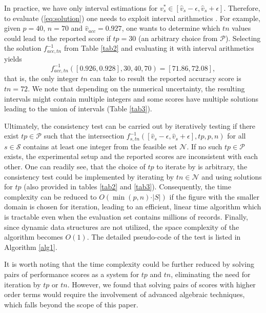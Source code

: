 \documentclass[3p, times]{elsarticle}
\begin{document}
In practice, we have only interval estimations for $v_s^* \in [\hat{v}_s - \epsilon, \hat{v}_s + \epsilon]$. Therefore, to evaluate (\ref{eq:solution}) one needs to exploit interval arithmetics \cite{interval}. For example, given $p=40$, $n=70$ and $\hat{v}_{acc} = 0.927$, one wants to determine which $tn$ values could lead to the reported score if $tp=30$ (an arbitrary choice from $\mathcal{P}$). Selecting the solution $f^{-1}_{acc, tn}$ from Table \ref{tab2} and evaluating it with interval arithmetics yields
\begin{equation}
f^{-1}_{acc, tn}([0.926, 0.928], 30, 40, 70) = [71.86, 72.08],
\end{equation}
that is, the only integer $tn$ can take to result the reported accuracy score is $tn=72$. We note that depending on the numerical uncertainty, the resulting intervals might contain multiple integers and some scores have multiple solutions leading to the union of intervals (Table \ref{tab3}).

Ultimately, the consistency test can be carried out by iteratively testing if there exist $tp\in\mathcal{P}$  such that the intersection $f_{s, tn}^{-1}([\hat{v}_s - \epsilon, \hat{v}_s + \epsilon], tp, p, n)$ for all $s\in\mathcal{S}$ contains at least one integer from the feasible set $\mathcal{N}$. If no such $tp\in\mathcal{P}$ exists, the experimental setup and the reported scores are inconsistent with each other. 
One can readily see, that the choice of $tp$ to iterate by is arbitrary, the consistency test could be implemented by iterating by $tn\in\mathcal{N}$ and using solutions for $tp$ (also provided in tables \ref{tab2} and \ref{tab3}). Consequently, the time complexity can be reduced to $O(\min(p, n)\cdot \vert S\vert)$ if the figure with the smaller domain is chosen for iteration, leading to an efficient, linear time algorithm which is tractable even when the evaluation set contains millions of records. {\color{blue} Finally, since dynamic data structures are not utilized, the space complexity of the algorithm becomes $O(1)$.} The detailed pseudo-code of the test is listed in Algorithm \ref{alg1}. 


It is worth noting that the time complexity could be further reduced by solving pairs of performance scores as a system for $tp$ and $tn$, eliminating the need for iteration by $tp$ or $tn$. However, we found that solving pairs of scores with higher order terms would require the involvement of advanced algebraic techniques, which falls beyond the scope of this paper.
\end{document}
